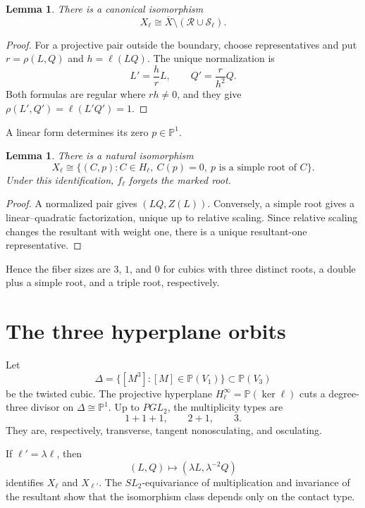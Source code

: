 \documentclass[11pt]{article}
\newcommand{\Pj}{\mathbb P}
\newtheorem{lemma}[theorem]{Lemma}
\theoremstyle{remark}
\begin{document}
\begin{lemma}\label{lem:projective-complement}
There is a canonical isomorphism
\[
X_\ell\cong\overline X\setminus(\mathcal R\cup\mathcal S_\ell).
\]
\end{lemma}

\begin{proof}
For a projective pair outside the boundary, choose representatives and put
$r=\rho(L,Q)$ and $h=\ell(LQ)$. The unique normalization is
\[
L'=\frac{h}{r}L,\qquad Q'=\frac{r}{h^2}Q.
\]
Both formulas are regular where $rh\ne0$, and they give
$\rho(L',Q')=\ell(L'Q')=1$.
\end{proof}

A linear form determines its zero $p\in\Pj^1$.

\begin{lemma}\label{lem:marked-root}
There is a natural isomorphism
\[
X_\ell\cong
\{(C,p):C\in H_\ell,\ C(p)=0,\ p\text{ is a simple root of }C\}.
\]
Under this identification, $f_\ell$ forgets the marked root.
\end{lemma}

\begin{proof}
A normalized pair gives $(LQ,Z(L))$. Conversely, a simple root gives a
linear--quadratic factorization, unique up to relative scaling. Since relative
scaling changes the resultant with weight one, there is a unique
resultant-one representative.
\end{proof}

Hence the fiber sizes are $3$, $1$, and $0$ for cubics with three distinct
roots, a double plus a simple root, and a triple root, respectively.

\section{The three hyperplane orbits}

Let
\[
\Delta=\{[M^3]:[M]\in\Pj(V_1)\}\subset\Pj(V_3)
\]
be the twisted cubic. The projective hyperplane
$H_\ell^\infty=\Pj(\ker\ell)$ cuts a degree-three divisor on $\Delta\cong\Pj^1$.
Up to $PGL_2$, the multiplicity types are
\[
1+1+1,\qquad 2+1,\qquad 3.
\]
They are, respectively, transverse, tangent nonosculating, and osculating.

If $\ell'=\lambda\ell$, then
\[
(L,Q)\mapsto(\lambda L,\lambda^{-2}Q)
\]
identifies $X_\ell$ and $X_{\ell'}$. The $SL_2$-equivariance of multiplication
and invariance of the resultant show that the isomorphism class depends only
on the contact type.
\end{document}
